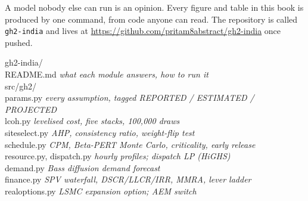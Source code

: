 \label{sec:engine}

A model nobody else can run is an opinion. Every figure and table in this book is produced by one command, from code anyone can read. The repository is called \texttt{gh2-india} and lives at \url{https://github.com/pritam8abstract/gh2-india} once pushed.

\begin{center}
\begin{minipage}{0.92\textwidth}
\ttfamily\fontsize{8}{10.5}\selectfont\color{ink}
gh2-india/\\
\hspace*{1em}README.md \hfill\textrm{\itshape\color{ink2} what each module answers, how to run it}\\
\hspace*{1em}src/gh2/\\
\hspace*{2em}params.py \hfill\textrm{\itshape\color{ink2} every assumption, tagged REPORTED / ESTIMATED / PROJECTED}\\
\hspace*{2em}lcoh.py \hfill\textrm{\itshape\color{ink2} levelised cost, five stacks, 100,000 draws}\\
\hspace*{2em}siteselect.py \hfill\textrm{\itshape\color{ink2} AHP, consistency ratio, weight-flip test}\\
\hspace*{2em}schedule.py \hfill\textrm{\itshape\color{ink2} CPM, Beta-PERT Monte Carlo, criticality, early release}\\
\hspace*{2em}resource.py, dispatch.py \hfill\textrm{\itshape\color{ink2} hourly profiles; dispatch LP (HiGHS)}\\
\hspace*{2em}demand.py \hfill\textrm{\itshape\color{ink2} Bass diffusion demand forecast}\\
\hspace*{2em}finance.py \hfill\textrm{\itshape\color{ink2} SPV waterfall, DSCR/LLCR/IRR, MMRA, lever ladder}\\
\hspace*{2em}realoptions.py \hfill\textrm{\itshape\color{ink2} LSMC expansion option; AEM switch}\\

\end{minipage}
\end{center}
